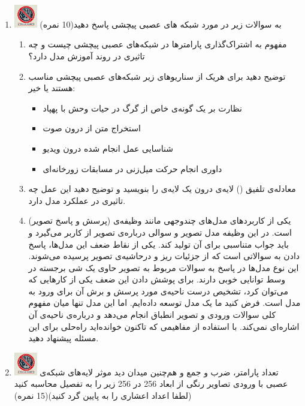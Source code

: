 \documentclass[12pt]{article}
\begin{document}
\begin{enumerate}
    \item \includegraphics[width=1cm]{figs/Forbidden_AI.jpg}
    به سوالات زیر در مورد شبکه های عصبی پیچشی پاسخ دهید(10 نمره)\\
    \begin{enumerate}
        \item مفهوم به اشتراک‌گذاری پارامترها در شبکه‌های عصبی پیچشی چیست و چه تاثیری در روند آموزش مدل دارد؟
        \item توضیح دهید برای هریک از سناریوهای زیر شبکه‌های عصبی پیچشی مناسب هستند یا خیر:
        \begin{itemize}
            \item نظارت بر یک گونه‌ی خاص از گرگ در حیات وحش با پهپاد
            \item استخراج متن از درون صوت
            \item شناسایی عمل انجام شده درون ویدیو
            \item داوری انجام حرکت میل‌زنی در مسابقات زورخانه‌ای
        \end{itemize}
        \item معادله‌ی تلفیق () لایه‌ی  درون یک لایه‌ی  را بنویسید و توضیح دهید این عمل چه تاثیری در عملکرد مدل دارد.
        \item یکی از کاربردهای مدل‌های چندوجهی  مانند  وظیفه‌ی   (پرسش و پاسخ تصویر) است. در این وظیفه مدل تصویر و سوالی درباره‌ی تصویر از کاربر می‌گیرد و باید جواب متناسبی برای آن تولید کند. یکی از نقاط ضعف این مدل‌ها، پاسخ دادن به سوالاتی است که از جزئیات ریز و درحاشیه‌ی تصویر پرسیده می‌شوند. این نوع مدل‌ها در پاسخ به سوالات مربوط به تصویر حاوی یک شی برجسته در وسط توانایی خوبی دارند. برای پوشش دادن این ضعف یکی از کارهایی که می‌توان کرد، تشخیص درست ناحیه‌ی مورد پرسش و برش آن برای ورود به مدل است. فرض کنید ما یک مدل  توسعه داده‌ایم. اما این مدل تنها میان مفهوم کلی سوالات ورودی و تصویر انطباق انجام می‌دهد و درباره‌ی ناحیه‌ی آن اشاره‌ای نمی‌کند. با استفاده از مفاهیمی که تاکنون خوانده‌اید راه‌حلی برای این مسئله پیشنهاد دهید.
    \end{enumerate}
    \newpage
    \item \includegraphics[width=1cm]{figs/Forbidden_AI.jpg}
    تعداد پارامتر، ضرب و جمع و هم‌چنین میدان دید موثر لایه‌های شبکه‌ی عصبی با ورودی تصاویر رنگی از ابعاد 256 در 256 زیر را به تفصیل محاسبه کنید (لطفا اعداد اعشاری را به پایین گرد کنید)(15 نمره)\\
    

\end{enumerate}
\end{document}
